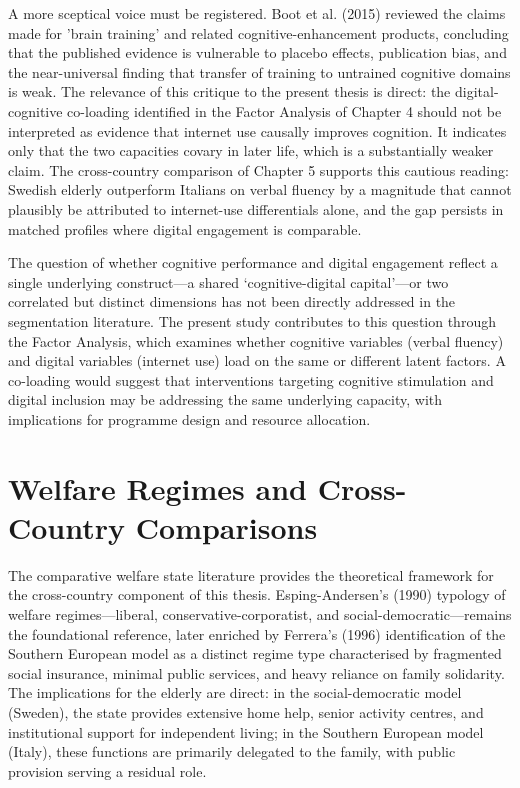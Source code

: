 A more sceptical voice must be registered. Boot et al. (2015) reviewed the claims made for 'brain training' and related cognitive-enhancement products, concluding that the published evidence is vulnerable to placebo effects, publication bias, and the near-universal finding that transfer of training to untrained cognitive domains is weak. The relevance of this critique to the present thesis is direct: the digital-cognitive co-loading identified in the Factor Analysis of Chapter 4 should not be interpreted as evidence that internet use causally improves cognition. It indicates only that the two capacities covary in later life, which is a substantially weaker claim. The cross-country comparison of Chapter 5 supports this cautious reading: Swedish elderly outperform Italians on verbal fluency by a magnitude that cannot plausibly be attributed to internet-use differentials alone, and the gap persists in matched profiles where digital engagement is comparable.

The question of whether cognitive performance and digital engagement reflect a single underlying construct---a shared `cognitive-digital capital'---or two correlated but distinct dimensions has not been directly addressed in the segmentation literature. The present study contributes to this question through the Factor Analysis, which examines whether cognitive variables (verbal fluency) and digital variables (internet use) load on the same or different latent factors. A co-loading would suggest that interventions targeting cognitive stimulation and digital inclusion may be addressing the same underlying capacity, with implications for programme design and resource allocation.

\section{Welfare Regimes and Cross-Country Comparisons}
The comparative welfare state literature provides the theoretical framework for the cross-country component of this thesis. Esping-Andersen's (1990) typology of welfare regimes---liberal, conservative-corporatist, and social-democratic---remains the foundational reference, later enriched by Ferrera's (1996) identification of the Southern European model as a distinct regime type characterised by fragmented social insurance, minimal public services, and heavy reliance on family solidarity. The implications for the elderly are direct: in the social-democratic model (Sweden), the state provides extensive home help, senior activity centres, and institutional support for independent living; in the Southern European model (Italy), these functions are primarily delegated to the family, with public provision serving a residual role.

